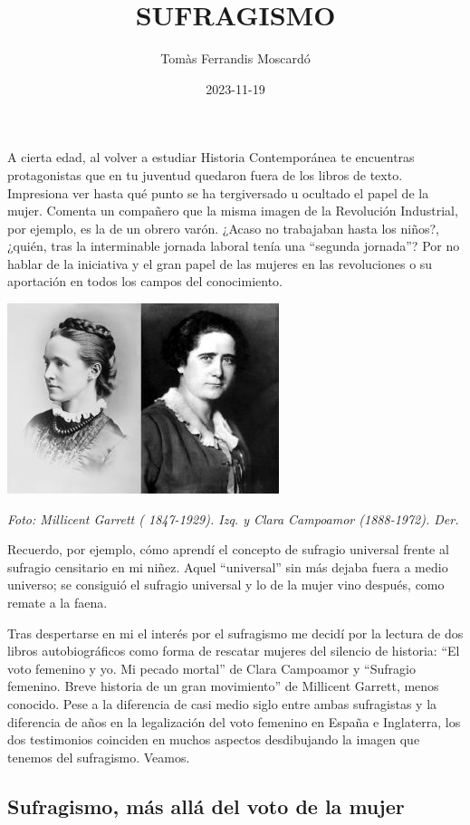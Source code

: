\documentclass[
]{article}
\title{SUFRAGISMO}
\author{Tomàs Ferrandis Moscardó}
\date{2023-11-19}
\begin{document}
\maketitle

{
\setcounter{tocdepth}{2}
\tableofcontents
}
A cierta edad, al volver a estudiar Historia Contemporánea te encuentras
protagonistas que en tu juventud quedaron fuera de los libros de texto.
Impresiona ver hasta qué punto se ha tergiversado u ocultado el papel de
la mujer. Comenta un compañero que la misma imagen de la Revolución
Industrial, por ejemplo, es la de un obrero varón. ¿Acaso no trabajaban
hasta los niños?, ¿quién, tras la interminable jornada laboral tenía una
``segunda jornada''? Por no hablar de la iniciativa y el gran papel de
las mujeres en las revoluciones o su aportación en todos los campos del
conocimiento.

\includegraphics{png/Clara_Campoamor-y-Millicent_Garret.jpg}

\emph{Foto: Millicent Garrett ( 1847-1929). Izq. y Clara Campoamor
(1888-1972). Der.}

Recuerdo, por ejemplo, cómo aprendí el concepto de sufragio universal
frente al sufragio censitario en mi niñez. Aquel ``universal'' sin más
dejaba fuera a medio universo; se consiguió el sufragio universal y lo
de la mujer vino después, como remate a la faena.

Tras despertarse en mi el interés por el sufragismo me decidí por la
lectura de dos libros autobiográficos como forma de rescatar mujeres del
silencio de historia: ``El voto femenino y yo. Mi pecado mortal'' de
Clara Campoamor y ``Sufragio femenino. Breve historia de un gran
movimiento'' de Millicent Garrett, menos conocido. Pese a la diferencia
de casi medio siglo entre ambas sufragistas y la diferencia de años en
la legalización del voto femenino en España e Inglaterra, los dos
testimonios coinciden en muchos aspectos desdibujando la imagen que
tenemos del sufragismo. Veamos.

\hypertarget{sufragismo-muxe1s-alluxe1-del-voto-de-la-mujer}{%
\subsection{Sufragismo, más allá del voto de la
mujer}\label{sufragismo-muxe1s-alluxe1-del-voto-de-la-mujer}}
\end{document}
